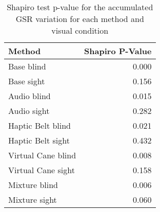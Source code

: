 
\begin{table}[!htb]
\centering
\caption{Shapiro test p-value for the accumulated GSR variation for each method and visual condition}
\label{tab:shapiro_gsr_sum_etp}
\begin{tabular}{lr}
\toprule
            Method &  Shapiro P-Value \\
\midrule
        Base blind &            0.000 \\
        Base sight &            0.156 \\
       Audio blind &            0.015 \\
       Audio sight &            0.282 \\
 Haptic Belt blind &            0.021 \\
 Haptic Belt sight &            0.432 \\
Virtual Cane blind &            0.008 \\
Virtual Cane sight &            0.158 \\
     Mixture blind &            0.006 \\
     Mixture sight &            0.060 \\
\bottomrule
\end{tabular}
\end{table}

